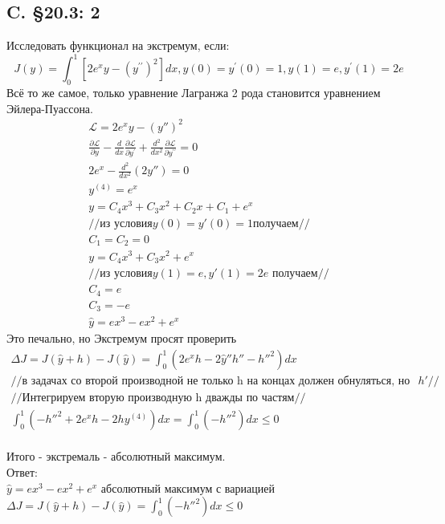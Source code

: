 \documentclass{article}
\newcommand{\Lagr}{\mathcal{L}}
\begin{document}
\subsection{C. \S20.3: 2}
Исследовать функционал на экстремум, если:
\begin{equation}
J(y)=\int_{0}^{1}\left[2 e^{x} y-\left(y^{\prime \prime}\right)^{2}\right] d x, y(0)=y^{\prime}(0)=1, y(1)=e, y^{\prime}(1)=2 e
\end{equation}
Всё то же самое, только уравнение Лагранжа 2 рода становится уравнением Эйлера-Пуассона.
\begin{gather*}
    \Lagr = 2e^xy - (y'')^2\\
    \frac{\partial \Lagr}{\partial y}-\frac{d}{d x} \frac{\partial \Lagr}{\partial y^{\prime}}+\frac{d^{2}}{d x^{2}} \frac{\partial \Lagr}{\partial y^{\prime \prime}}=0\\
    2e^x - \frac{d ^2}{d x^2} (2y'')=0\\
    y^{(4)}=e^x\\
    y=C_4 x^3+C_3 x^2+C_2 x+C_1+e^x\\
    //\text{из условия} y(0)=y'(0)=1 \text{получаем} //\\
    C_1=C_2=0\\
     y=C_4 x^3+C_3 x^2+e^x\\
     //\text{из условия} y(1)=e, y'(1)=2e \text{ получаем} //\\
     C_4=e\\
     C_3=-e\\
     \hat y = ex^3-ex^2+e^x
\end{gather*}
Это печально, но Экстремум просят проверить\\
\begin{gather*}
    \Delta J = J(\hat y + h) - J(\hat y) = \int_0^1(2e^xh-2 \hat y'' h'' - h''^2)dx\\
    //\text{в задачах со второй производной не только h на концах должен обнуляться, но и } h'//\\
    // \text{Интегрируем вторую производную h дважды по частям}//\\
    \int_0^1 \left(-h''^2+2e^xh  - 2h y^{(4)} \right)dx = \int_0^1 \left(-h''^2 \right)dx \leq 0
\end{gather*}\\
Итого - экстремаль - абсолютный максимум.\\
Ответ:\\
$\hat y = ex^3-ex^2+e^x$  абсолютный максимум с вариацией $\Delta J = J(\hat y + h) - J(\hat y) =\int_0^1 \left(-h''^2 \right)dx \leq 0$ 
\end{document}

